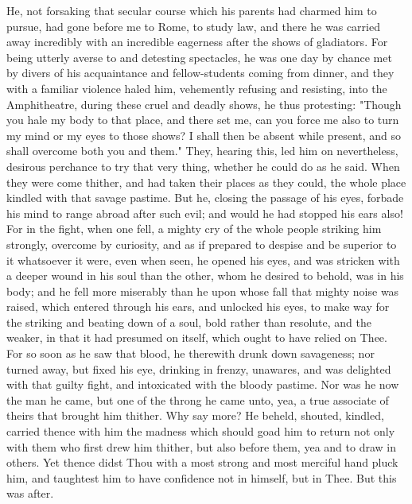 \documentclass[b5paper,openright,12pt,twoside]{book}
\begin{document}
He, not forsaking that secular course which his parents had charmed him
to pursue, had gone before me to Rome, to study law, and there he was
carried away incredibly with an incredible eagerness after the shows of
gladiators. For being utterly averse to and detesting spectacles, he was
one day by chance met by divers of his acquaintance and fellow-students
coming from dinner, and they with a familiar violence haled him,
vehemently refusing and resisting, into the Amphitheatre, during these
cruel and deadly shows, he thus protesting: "Though you hale my body to
that place, and there set me, can you force me also to turn my mind or
my eyes to those shows? I shall then be absent while present, and
so shall overcome both you and them." They, hearing this, led him on
nevertheless, desirous perchance to try that very thing, whether he
could do as he said. When they were come thither, and had taken their
places as they could, the whole place kindled with that savage pastime.
But he, closing the passage of his eyes, forbade his mind to range
abroad after such evil; and would he had stopped his ears also! For in
the fight, when one fell, a mighty cry of the whole people striking him
strongly, overcome by curiosity, and as if prepared to despise and be
superior to it whatsoever it were, even when seen, he opened his eyes,
and was stricken with a deeper wound in his soul than the other, whom he
desired to behold, was in his body; and he fell more miserably than he
upon whose fall that mighty noise was raised, which entered through his
ears, and unlocked his eyes, to make way for the striking and beating
down of a soul, bold rather than resolute, and the weaker, in that it
had presumed on itself, which ought to have relied on Thee. For so soon
as he saw that blood, he therewith drunk down savageness; nor turned
away, but fixed his eye, drinking in frenzy, unawares, and was delighted
with that guilty fight, and intoxicated with the bloody pastime. Nor was
he now the man he came, but one of the throng he came unto, yea, a true
associate of theirs that brought him thither. Why say more? He beheld,
shouted, kindled, carried thence with him the madness which should goad
him to return not only with them who first drew him thither, but also
before them, yea and to draw in others. Yet thence didst Thou with a
most strong and most merciful hand pluck him, and taughtest him to have
confidence not in himself, but in Thee. But this was after.
\end{document}
